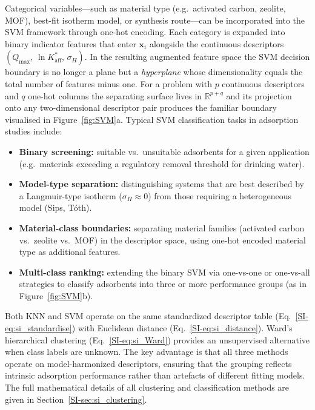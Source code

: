 \documentclass[journal=jacsat,manuscript=article]{achemso}
\begin{document}
	Categorical variables---such as material type (e.g.\ activated carbon, zeolite, MOF), best-fit isotherm model, or synthesis route---can be incorporated into the SVM framework through one-hot encoding. Each category is expanded into binary indicator features that enter $\mathbf{x}_i$ alongside the continuous descriptors $(Q_{\max},\, \ln K_{\mathrm{aff}}^{\ast},\, \sigma_H)$. In the resulting augmented feature space the SVM decision boundary is no longer a plane but a \emph{hyperplane} whose dimensionality equals the total number of features minus one. For a problem with $p$ continuous descriptors and $q$ one-hot columns the separating surface lives in $\mathbb{R}^{p+q}$ and its projection onto any two-dimensional descriptor pair produces the familiar boundary visualised in Figure~\ref{fig:SVM}a. Typical SVM classification tasks in adsorption studies include:
	\begin{itemize}
		\item \textbf{Binary screening:} suitable vs.\ unsuitable adsorbents for a given application (e.g.\ materials exceeding a regulatory removal threshold for drinking water).
		\item \textbf{Model-type separation:} distinguishing systems that are best described by a Langmuir-type isotherm ($\sigma_H \approx 0$) from those requiring a heterogeneous model (Sips, T\'{o}th).
		\item \textbf{Material-class boundaries:} separating material families (activated carbon vs.\ zeolite vs.\ MOF) in the descriptor space, using one-hot encoded material type as additional features.
		\item \textbf{Multi-class ranking:} extending the binary SVM via one-vs-one or one-vs-all strategies to classify adsorbents into three or more performance groups (as in Figure~\ref{fig:SVM}b).
	\end{itemize}

	Both KNN and SVM operate on the same standardized descriptor table (Eq.~\ref{SI-eq:si_standardise}) with Euclidean distance (Eq.~\ref{SI-eq:si_distance}). Ward's hierarchical clustering (Eq.~\ref{SI-eq:si_Ward}) provides an unsupervised alternative when class labels are unknown. The key advantage is that all three methods operate on model-harmonized descriptors, ensuring that the grouping reflects intrinsic adsorption performance rather than artefacts of different fitting models. The full mathematical details of all clustering and classification methods are given in Section~\ref{SI-sec:si_clustering}.
\end{document}
